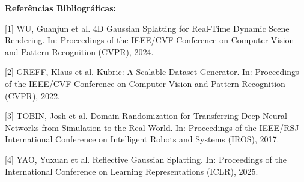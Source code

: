 \documentclass[11pt,a4paper]{article}
\newcommand{\faixa}[2][\large]{%
  \par\noindent\colorbox{faixa}{\parbox{\dimexpr\linewidth-2\fboxsep}{\sffamily\bfseries#1 #2}}\par}
\begin{document}
\vspace{1.2em}
\faixa{Referências Bibliográficas:}
\vspace{0.6em}

{\small
[1] WU, Guanjun et al. 4D Gaussian Splatting for Real-Time Dynamic Scene Rendering. In: Proceedings of the IEEE/CVF Conference on Computer Vision and Pattern Recognition (CVPR), 2024.

[2] GREFF, Klaus et al. Kubric: A Scalable Dataset Generator. In: Proceedings of the IEEE/CVF Conference on Computer Vision and Pattern Recognition (CVPR), 2022.

[3] TOBIN, Josh et al. Domain Randomization for Transferring Deep Neural Networks from Simulation to the Real World. In: Proceedings of the IEEE/RSJ International Conference on Intelligent Robots and Systems (IROS), 2017.

[4] YAO, Yuxuan et al. Reflective Gaussian Splatting. In: Proceedings of the International Conference on Learning Representations (ICLR), 2025.
\par}
\end{document}
